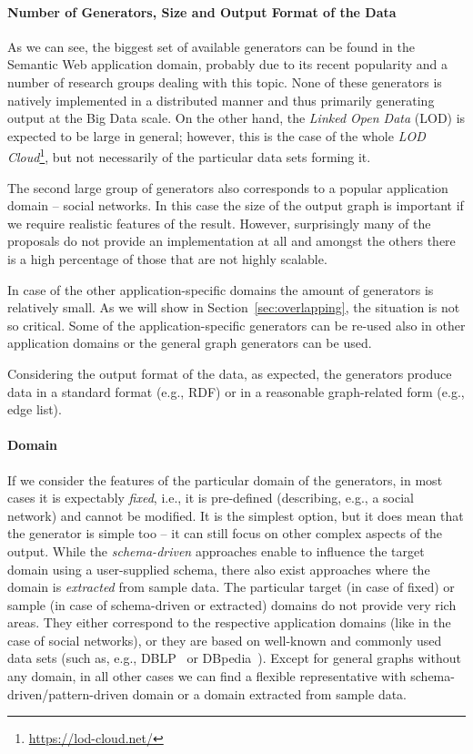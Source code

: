 \paragraph{Number of Generators, Size and Output Format of the Data}
As we can see, the biggest set of available generators can be found in the Semantic Web application domain, probably due to its recent popularity and a number of research groups dealing with this topic. None of these generators is natively implemented in a distributed manner and thus primarily generating  output at the Big Data scale. On the other hand, the \emph{Linked Open Data} (LOD) is expected to be large in general; however, this is the case of the whole \emph{LOD Cloud}\footnote{\url{https://lod-cloud.net/}}, but not necessarily of the particular data sets forming it.

The second large group of generators also corresponds to a popular application domain -- social networks. In this case the size of the output graph is important if we require realistic features of the result. However, surprisingly many of the proposals do not provide an implementation at all and amongst the others there is a high percentage of those that are not highly scalable.

In case of the other application-specific domains the amount of generators is relatively small. As we will show in Section~\ref{sec:overlapping}, the situation is not so critical. Some of the application-specific generators can be re-used also in other application domains or the general graph generators can be used.

Considering the output format of the data, as expected, the generators produce data in a standard format (e.g., RDF) or in a reasonable graph-related form (e.g., edge list).

\paragraph{Domain}

If we consider the features of the particular domain of the generators, in most cases it is expectably \emph{fixed}, i.e., it is pre-defined (describing, e.g., a social network) and cannot be modified. It is the simplest option, but it does mean that the generator is simple too -- it can still focus on other complex aspects of the output. While the \emph{schema-driven} approaches enable to influence the target domain using a user-supplied schema, there also exist approaches where the domain is \emph{extracted} from sample data. The particular target (in case of fixed) or sample (in case of schema-driven or extracted) domains do not provide very rich areas. They either correspond to the respective application domains (like in the case of social networks), or they are based on well-known and commonly used data sets (such as, e.g., DBLP~\cite{dblp} or DBpedia~\cite{Bizer:2009:DCP:1640541.1640848}). Except for general graphs without any domain, in all other cases we can find a flexible representative with schema-driven/pattern-driven domain or a domain extracted from sample data.


